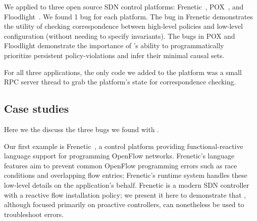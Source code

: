 We applied \projectname{} to three open source SDN control platforms: 
Frenetic~\cite{frenetic}, POX~\cite{pox}, and Floodlight~\cite{bigswitch}.
We found 1 bug for each platform. The bug in Frenetic demonstrates 
the utility of checking correspondence between high-level policies and
low-level configuration (without needing to specify invariants). The bugs in
POX and Floodlight demonstrate the importance of \simulator{}'s ability to 
programmatically prioritize persistent policy-violations and infer their minimal
causal sets.

For all three applications, the only code we added to the platform was
a small RPC server thread to grab the platform's state for correspondence
checking. 

\subsection{Case studies}

Here we the discuss the three bugs we found with \projectname{}.


Our first example is Frenetic~\cite{frenetic}, a control platform 
providing functional-reactive language
support for programming OpenFlow networks.
Frenetic's language features aim to prevent common OpenFlow programming
errors such as race conditions and overlapping flow entries; Frenetic's
runtime system handles these low-level details on
the application's behalf. Frenetic is a modern SDN controller with a reactive
flow installation policy;
we present it here to demonstrate that \projectname{}, although focused
primarily on proactive controllers, can nonetheless be used to
troubleshoot errors.

